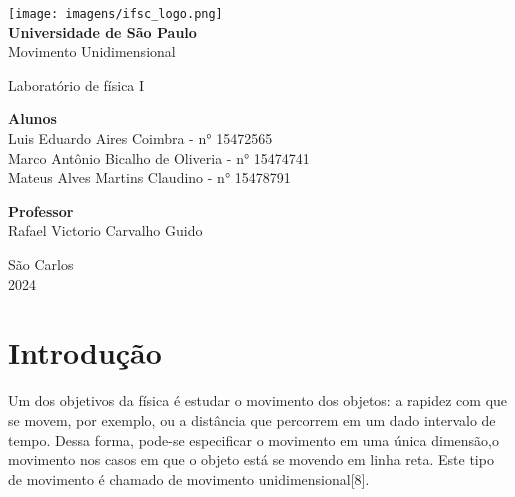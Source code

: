 \documentclass[12pt, letterpaper]{article}
\begin{document}
\begin{titlepage}
    \begin{center}
        \Large
       
        \vspace*{1cm}

        \texttt{[image: imagens/ifsc\_logo.png]} \\
        \Huge
        \textbf{Universidade de São Paulo} \\
        \huge
        Movimento Unidimensional
        
        \Large
        Laboratório de física I

        \vspace{4cm}
        \Large
        
    \end{center}
   
    \begin{flushright}
        \Large
        \textbf{Alunos}\\
        \large
            Luis Eduardo Aires Coimbra - n° 15472565\\
            Marco Antônio Bicalho de Oliveria - n° 15474741\\
            Mateus Alves Martins Claudino - n° 15478791
            
    \end{flushright}

    \begin{flushright}
        \Large
        \textbf{Professor}\\
       Rafael Victorio Carvalho Guido
        \large
            
            
    \end{flushright}
    
    \vspace*{\fill}
    \centering \large São Carlos \\ 2024
    
\end{titlepage}
 \tableofcontents
 \newpage

\section{Introdução}
Um dos objetivos da física é estudar o movimento dos objetos: a rapidez com
que se movem, por exemplo, ou a distância que percorrem em um dado intervalo de
tempo. Dessa forma, pode-se especificar o movimento em uma única dimensão,o movimento nos casos em que o objeto está se movendo em linha reta. Este
tipo de movimento é chamado de movimento unidimensional[8].
\end{document}
